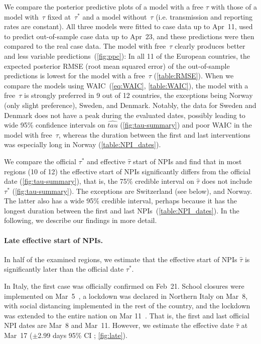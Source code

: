 \documentclass[12pt]{extarticle}
\begin{document}
We compare the posterior predictive plots of a model with a free $\tau$ with those of a model with~$\tau$ fixed at~$\tau^*$ and a model without~$\tau$ (i.e. transmission and reporting rates are constant).
All three models were fitted to case data up to Apr~11, used to predict out-of-sample case data up to Apr~23, and these predictions were then compared to the real case data. 
The model with free~$\tau$ clearly produces better and less variable predictions~(\autoref{fig:ppc}):
In all 11 of the European countries, the expected posterior RMSE (root mean squared error) of the out-of-sample predictions is lowest for the model with a free~$\tau$ (\autoref{table:RMSE}).
When we compare the models using WAIC~(\autoref{eq:WAIC}, \autoref{table:WAIC}), the model with a free~$\tau$ is strongly preferred in 9 out of 12 countries, the exceptions being Norway (only slight preference), Sweden, and Denmark. Notably, the data for Sweden and Denmark does not have a peak during the evaluated dates, possibly leading to wide 95\% confidence intervals on $\hat{tau}$ (\autoref{fig:tau-summary}) and poor WAIC in the model with free~$\tau$, whereas the duration between the first and last interventions was especially long in Norway (\autoref{table:NPI_dates}).

We compare the official $\tau^*$ and effective $\hat{\tau}$ start of NPIs and find that in most regions (10 of 12) the effective start of NPIs  significantly differs from the official date (\autoref{fig:tau-summary}), that is, the 75\% credible interval on $\hat{\tau}$ does not include $\tau^*$ (\autoref{fig:tau-summary}).
The exceptions are Switzerland (see below), and Norway.
The latter also has a wide 95\% credible interval, perhaps because it has the longest duration between the first and last NPIs~(\autoref{table:NPI_dates}).
In the following, we describe our findings in more detail.



\paragraph*{Late effective start of NPIs.}
In half of the examined regions, we estimate that the effective start of NPIs $\hat{\tau}$ is significantly later than the official date $\tau^*$. 

In Italy, the first case was officially confirmed on Feb~21. School closures were implemented on Mar~5~\citep{Flaxman2020}, a lockdown was declared in Northern Italy on Mar~8, with social distancing implemented in the rest of the country, and the lockdown was extended to the entire nation on Mar 11~\citep{Gatto2020}.
That is, the first and last official NPI dates are Mar~8 and Mar~11.
However, we estimate the effective date $\hat{\tau}$ at Mar~17 ($\pm$2.99 days 95\% CI ; \autoref{fig:late}). 
\end{document}
